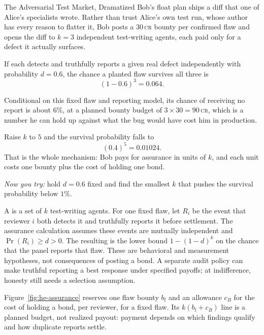 \documentclass[11pt,a4paper]{article}
\theoremstyle{definition}
\theoremstyle{definition}
\theoremstyle{remark}
\begin{document}
\begin{pdexample}{The Adversarial Test Market, Dramatized}
\setlength{\parskip}{4pt plus 1pt}
Bob's float plan ships a diff
that one of Alice's specialists wrote. Rather than trust Alice's own test run,
whose author has every reason to flatter it, Bob posts a $30$\,\textsc{cr}
bounty per confirmed flaw and opens the diff to $k=3$ independent test-writing
agents, each paid only for a defect it actually surfaces.

If each detects and truthfully reports a given
real defect independently with probability $d = 0.6$, the chance a planted flaw
survives all three is \[
(1-0.6)^3 = 0.064.
\]

Conditional on this fixed flaw and reporting model, its chance of receiving
no report is about $6\%$, at a planned bounty budget of $3 \times 30 = 90$\,\textsc{cr}, which is a number he
can hold up against what the bug would have cost him in production.

Raise $k$ to $5$
and the survival probability falls to \[
(0.4)^5 = 0.01024.
\] That is the whole mechanism: Bob
pays for assurance in units of $k$, and each unit costs one bounty plus the
cost of holding one bond.

\emph{Now you try:} hold $d=0.6$ fixed and find
the smallest $k$ that pushes the survival probability below $1\%$.
\end{pdexample}

A  is a set of $k$ test-writing agents.
For one fixed flaw, let $R_i$ be the event that reviewer $i$ both detects it
and truthfully reports it before settlement. The assurance calculation assumes
these events are mutually independent and $\Pr(R_i)\ge d>0$. The resulting
 is the lower bound $1-(1-d)^k$ on the chance that the
panel reports that flaw.
These are behavioral and measurement hypotheses, not consequences of posting a
bond. A separate audit policy can make truthful reporting a best response under
specified payoffs; at indifference, honesty still needs a selection assumption.

Figure~\ref{fig:he-assurance} reserves one flaw bounty $b_{\mathrm f}$ and an allowance
$c_B$ for the cost of holding a bond, per reviewer, for a fixed flaw. Its $k(b_{\mathrm f}+c_B)$ line is a planned
budget, not realized payout: payment depends on which findings qualify and how
duplicate reports settle.


\FloatBarrier
\end{document}
